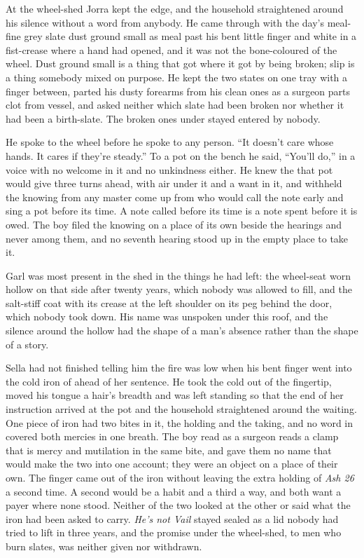 At the wheel-shed Jorra kept the edge, and the household straightened around his silence without a word from anybody. He came through  with the day's meal-fine grey slate dust ground small as meal past his bent little finger and white in a fist-crease where a hand had opened, and it was not the bone-coloured  of the wheel. Dust ground small is a thing that got where it got by being broken; slip is a thing somebody mixed on purpose. He kept the two states on one tray with a finger between, parted his dusty forearms from his clean ones as a surgeon parts clot from vessel, and asked neither which slate had been broken nor whether it had been a birth-slate. The broken ones under  stayed entered by nobody.

He spoke to the wheel before he spoke to any person. “It doesn't care whose hands. It cares if they're steady.” To a pot on the bench he said, “You'll do,” in a voice with no welcome in it and no unkindness either. He knew the  that pot would give three turns ahead, with air under it and a want in it, and withheld the knowing from any master come up from  who would call the note early and sing a pot before its time. A note called before its time is a note spent before it is owed. The boy filed the knowing on a place of its own beside the hearings and never among them, and no seventh hearing stood up in the empty place to take it.

Garl was most present in the shed in the things he had left: the wheel-seat worn hollow on that side after twenty years, which nobody was allowed to fill, and the salt-stiff coat with its crease at the left shoulder on its peg behind the door, which nobody took down. His name was unspoken under this roof, and the silence around the hollow had the shape of a man's absence rather than the shape of a story.

Sella had not finished telling him the fire was low when his bent finger went into the cold iron of  ahead of her sentence. He took the cold out of the fingertip, moved his tongue a hair's breadth and was left standing so that the end of her instruction arrived at the pot and the household straightened around the waiting. One piece of iron had two bites in it, the holding and the taking, and no word in  covered both mercies in one breath. The boy read  as a surgeon reads a clamp that is mercy and mutilation in the same bite, and gave them no name that would make the two into one account; they were an object on a place of their own. The finger came out of the iron without leaving the extra holding of \emph{Ash 26} a second time. A second would be a habit and a third a way, and both want a payer where none stood. Neither of the two looked at the other or said what the iron had been asked to carry. \emph{He's not Vail} stayed sealed as a lid nobody had tried to lift in three years, and the promise under the wheel-shed, to men who burn slates, was neither given nor withdrawn.

